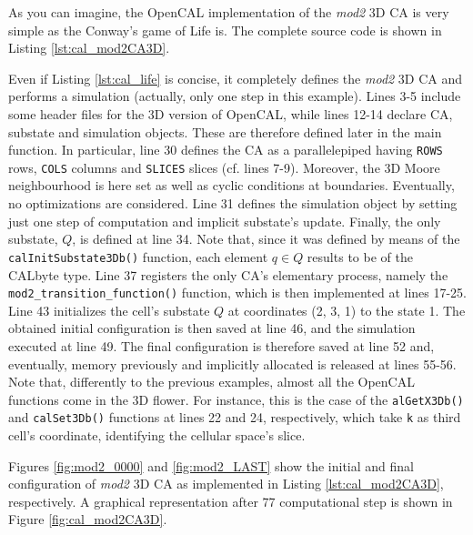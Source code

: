 As you can imagine, the OpenCAL implementation of the \emph{mod2} 3D
CA is very simple as the Conway's game of Life is. The complete
source code is shown in Listing \ref{lst:cal_mod2CA3D}.



Even if Listing \ref{lst:cal_life} is concise, it
completely defines the \emph{mod2} 3D CA and performs a simulation
(actually, only one step in this example). Lines 3-5 include some
header files for the 3D version of OpenCAL, while lines 12-14 declare
CA, substate and simulation objects. These are therefore defined later
in the main function. In particular, line 30 defines the CA as a
parallelepiped having \verb'ROWS' rows, \verb'COLS' columns and
\verb'SLICES' slices (cf. lines 7-9). Moreover, the 3D Moore
neighbourhood is here set as well as cyclic conditions at
boundaries. Eventually, no optimizations are considered. Line 31
defines the simulation object by setting just one step of computation
and implicit substate's update. Finally, the only substate, $Q$, is
defined at line 34. Note that, since it was defined by means of the
\verb'calInitSubstate3Db()' function, each element $q \in Q$ results
to be of the CALbyte type. Line 37 registers the only CA's elementary
process, namely the \verb'mod2_transition_function()' function, which
is then implemented at lines 17-25. Line 43 initializes the cell's
substate $Q$ at coordinates (2, 3, 1) to the state 1. The obtained
initial configuration is then saved at line 46, and the
simulation executed at line 49. The final configuration is therefore saved
at line 52 and, eventually, memory previously and implicitly
allocated is released at lines 55-56. Note that, differently to the
previous examples, almost all the OpenCAL functions come in the 3D
flower. For instance, this is the case of the \verb'alGetX3Db()' and
\verb'calSet3Db()' functions at lines 22 and 24, respectively, which
take \verb'k' as third cell's coordinate, identifying the cellular
space's slice.

Figures \ref{fig:mod2_0000} and \ref{fig:mod2_LAST} show the initial
and final configuration of \emph{mod2} 3D CA as implemented in Listing
\ref{lst:cal_mod2CA3D}, respectively. A graphical representation after
77 computational step is shown in Figure \ref{fig:cal_mod2CA3D}.

